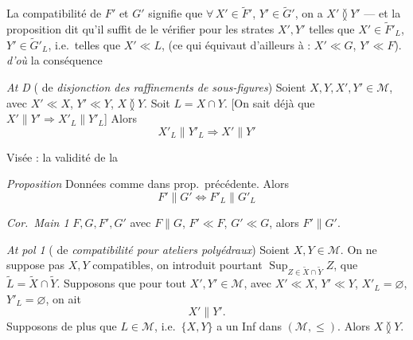 \documentclass[11pt,a4paper]{article}
\begin{document}
La compatibilité de $F'$ et $G'$ signifie que $\forall\, X' \in \widetilde{F}'$, $Y' \in \widetilde{G}'$, on a $X' \between Y'$ — et la proposition dit qu'il suffit de le vérifier pour les strates $X', Y'$ telles que $X' \in \widetilde{F}'_{L}$, $Y' \in \widetilde{G}'_{L}$, i.e.\ telles que \struck{\ill{}} $X' \ll L$,  \struck{\ill{}} (ce qui équivaut d'ailleurs à :  $X' \ll G$, $Y' \ll F$). \struck{\ill{}} \emph{d'où}  la conséquence

\emph{At D} (  de \emph{disjonction des raffinements de sous-figures}) Soient $X, Y, X', Y' \in \mathcal{M}$, avec $X' \ll X$, $Y' \ll Y$, $X \between Y$. Soit $L = X \cap Y$. [On sait déjà que $X' \parallel Y' \Rightarrow X'_{L} \parallel Y'_{L}$] Alors
\[
  X'_{L} \parallel Y'_{L} \Longrightarrow X' \parallel Y'
\]

Visée : la validité de la

\emph{Proposition} \quad Données comme dans prop.\ précédente. Alors
\[
  F' \parallel G' \Longleftrightarrow F'_{L} \parallel G'_{L}
\]

\emph{Cor.\ Main 1}   $F, G, F', G'$ avec $F \parallel G$, $F' \ll F$, $G' \ll G$, alors $F' \parallel G'$.


\emph{At pol 1} (  de \emph{compatibilité pour ateliers polyédraux}) Soient $X, Y \in \mathcal{M}$. On ne suppose pas $X, Y$ compatibles, on introduit pourtant  $\mathop{\mathrm{Sup}}_{Z \in \widetilde{X} \cap \widetilde{Y}} Z$,  que $\widetilde{L} = \widetilde{X} \cap \widetilde{Y}$. Supposons que pour tout $X', Y' \in \mathcal{M}$, avec $X' \ll X$, $Y' \ll Y$, \struck{\ill{}} $X'_{L} = \varnothing$, $Y'_{L} = \varnothing$, on ait
\[
  X' \parallel Y' .
\]
 Supposons de plus que  $L \in \mathcal{M}$, i.e.\ $\lbrace X, Y \rbrace$  \struck{\ill{}} a un Inf dans $(\mathcal{M}, \leq)$. Alors $X \between Y$.
\end{document}

